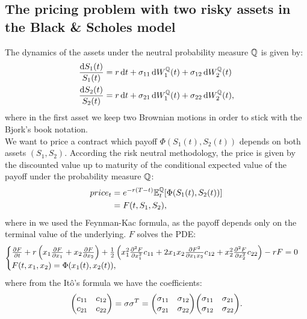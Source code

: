 \subsection[Pricing]{The pricing problem with two risky assets in the Black \& Scholes model}
The dynamics of the assets under the neutral probability measure $\mathbb{Q}$ is given by:
\begin{align}
    \dfrac{\dd S_1(t)}{S_1(t)} &= r\,\dd t + \sigma_{11}\,\dd W_1^{\mathbb{Q}}(t) + \sigma_{12}\,\dd W_2^{\mathbb{Q}}(t) \\
    \dfrac{\dd S_2(t)}{S_2(t)} &= r\,\dd t + \sigma_{21}\,\dd W_1^{\mathbb{Q}}(t) + \sigma_{22}\,\dd W_2^{\mathbb{Q}}(t),
\end{align}
where in the first asset we keep two Brownian motions in order to stick with the Bjork's book notation. \\
We want to price a contract which payoff $\Phi(S_1(t),S_2(t))$ depends on both assets $(S_1,S_2)$. According the risk neutral methodology, the price is given by the discounted value up to maturity of the conditional expected value of the payoff under the probability measure $\mathbb{Q}$:
\begin{align}
    price_t &= e^{-r(T-t)}\mathbb{E}^{\mathbb{Q}}_t[\Phi(S_1(t),S_2(t))] \\
    &=
    F(t,S_1,S_2),
\end{align}
where in we used the Feynman-Kac formula, as the payoff depends only on the terminal value of the underlying. $F$ solves the PDE: %
\begin{equation}\label{bspdee}
    \begin{cases}
    \pdv{F}{t} + r\left(x_1\pdv{F}{x_1} + x_2\pdv{F}{x_2}\right) + \frac{1}{2}\left(x_1^2\pdv[2]{F}{x_1}c_{11} + 2x_1x_2\pdv{F^2}{x_1x_2}c_{12} + x_2^2\pdv[2]{F}{x_2}c_{22}\right) - rF = 0 \\
    F(t,x_1,x_2) = \Phi(x_1(t),x_2(t)),
    \end{cases}
\end{equation}
where from the Itô's formula we have the coefficients:
\begin{equation}
    \mqty(c_{11}&c_{12}\\c_{21}&c_{22}) = \sigma\sigma^T = \mqty(\sigma_{11}&\sigma_{12}\\\sigma_{21}&\sigma_{22})\mqty(\sigma_{11}&\sigma_{21}\\\sigma_{12}&\sigma_{22}).
\end{equation}
